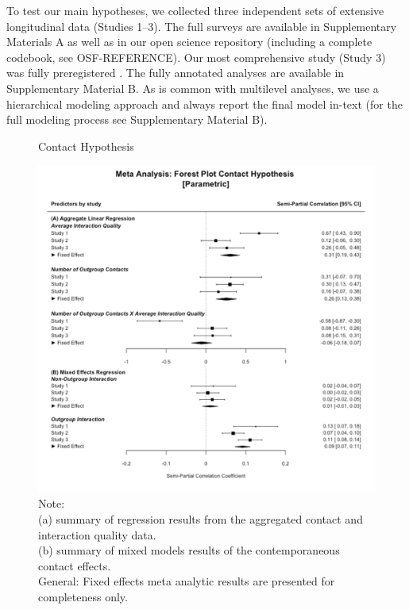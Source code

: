 \documentclass[man, 12pt, a4paper, mask]{apa7}
\theoremstyle{break}
\theoremstyle{plain}
\begin{document}
To test our main hypotheses, we collected three independent sets of extensive longitudinal data (Studies 1–3). The full surveys are available in Supplementary Materials A as well as in our open science repository (including a complete codebook, see OSF-REFERENCE). Our most comprehensive study (Study 3) was fully preregistered  \citep[available at][]{Kreienkamp2021f}. The fully annotated analyses are available in Supplementary Material B. As is common with multilevel analyses, we use a hierarchical modeling approach and always report the final model in-text (for the full modeling process see Supplementary Material B).



\begin{figure}
  \caption{Contact Hypothesis}
  \label{fig:ContactHypothesis}
  \centering\includegraphics[width=\textwidth]{Figures/forestParametricGeneralComb.png}
  \caption*{Note: \\
  (a) summary of regression results from the aggregated contact and interaction quality data.\\
  (b) summary of mixed models results of the contemporaneous contact effects.\\
  General: Fixed effects meta analytic results are presented for completeness only.}
\end{figure}
\end{document}

